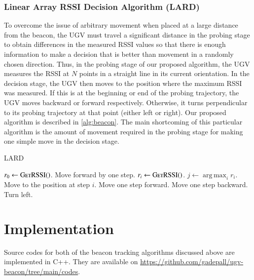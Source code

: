 \documentclass[conference]{IEEEtran}
\DeclareMathOperator*{\argmax}{arg\,max}
\begin{document}
\subsubsection{Linear Array RSSI Decision Algorithm (LARD)}
\label{subsubsec:proposed-algorithm}

To overcome the issue of arbitrary movement when placed at a large distance from
the beacon, the UGV must travel a significant distance in the probing stage to
obtain differences in the measured RSSI values so that there is enough
information to make a decision that is better than movement in a randomly chosen
direction. Thus, in the probing stage of our proposed algorithm, the UGV
measures the RSSI at \(N\) points in a straight line in its current orientation.
In the decision stage, the UGV then moves to the position where the maximum RSSI
was measured. If this is at the beginning or end of the probing trajectory, the
UGV moves backward or forward respectively. Otherwise, it turns perpendicular to
its probing trajectory at that point (either left or right). Our proposed
algorithm is described in \autoref{alg:beacon}. The main shortcoming of this
particular algorithm is the amount of movement required in the probing stage for
making one simple move in the decision stage.

\begin{algorithm}[H]
    \caption{LARD}
    \label{alg:beacon}
    \begin{algorithmic}[1]
            \State \(r_0 \gets \textsc{GetRSSI()}\).
                \State Move forward by one step.
                \State \(r_i \gets \textsc{GetRSSI()}\).
            \EndFor
            \State \(j \gets \argmax_{i} r_i\).
            \State Move to the position at step \(i\).
                \State Move one step forward.
                \State Move one step backward.
            \Else
                \State Turn left.
            \EndIf
        \EndWhile
    \end{algorithmic}
\end{algorithm}

\section{Implementation}
\label{sec:implementation}

Source codes for both of the beacon tracking algorithms discussed above are
implemented in C++. They are available on
\href{https://github.com/gadepall/ugv-beacon/tree/main/codes}{https://github.com/gadepall/ugv-beacon/tree/main/codes}.
%
\end{document}
